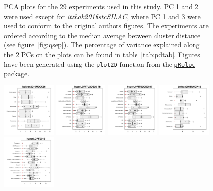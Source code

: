 \documentclass[12pt]{article}\usepackage[]{graphicx}\usepackage[]{color}
\newenvironment{knitrout}{}{} %
\newcommand{\Rpackage}[1]{\texttt{#1}}
\newcommand\Biocpkg[1]{%
  {\href{http://bioconductor.org/packages/#1}%
    {\Rpackage{#1}}}}
\begin{document}
\begin{figure}[p]
\begin{knitrout}
\end{knitrout}
\caption{PCA plots for the 29 experiments used in
  this study. PC 1 and 2 were used except for
  \textit{itzhak2016stcSILAC}, where PC 1 and 3 were used to conform to
  the original authors figures. The experiments are ordered according
  to the median average between cluster distance (see
  figure~\ref{fig:qsep}). The percentage of variance explained along
  the 2 PCs on the plots can be found in
  table~\ref{tab:pdtab}. Figures have been generated using the
  \texttt{plot2D} function from the \Biocpkg{pRoloc} package.}
  \label{fig:pca}
\end{figure}







\begin{figure}[p]
  \centering
  \includegraphics[width = 0.24\textwidth]{./figure/allqseps-1.pdf}
  \includegraphics[width = 0.24\textwidth]{./figure/allqseps-2.pdf}
  \includegraphics[width = 0.24\textwidth]{./figure/allqseps-3.pdf}
  \includegraphics[width = 0.24\textwidth]{./figure/allqseps-4.pdf}
  \includegraphics[width = 0.24\textwidth]{./figure/allqseps-5.pdf}

\end{figure}
\end{document}

